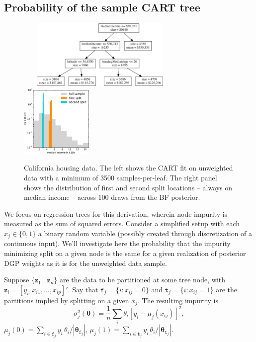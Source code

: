 \documentclass{article}
\begin{document}
\subsection{Probability of the sample CART
tree}\label{probability-of-the-sample-cart-tree}



\begin{figure}
~~~
\includegraphics[width=0.6\textwidth]{../graphs/ca_trunk}
~~~~~~
\includegraphics[width=0.31\textwidth]{../graphs/ca_splits}
\caption{\label{calistable} California housing data.  The left shows the CART fit  on unweighted data with a minimum of 3500 samples-per-leaf. The right panel shows the distribution of first and second split locations -- always on median income  -- across 100 draws from the BF posterior. }
\end{figure}

We focus on regression trees for this derivation, wherein node impurity is
measured as the sum of squared errors. Consider a simplified setup
with each $x_j \in \{0,1\}$  a binary random variable (possibly
created through discretization of a continuous input).  We'll investigate here the probability that the impurity minimizing split on a given node is the same for a given realization of posterior DGP weights as it is for the unweighted data sample.   

Suppose  $\{\mathbf{z}_1 \ldots \mathbf{z}_n\}$ are the data to be partitioned at some tree node, with $\mathbf{z}_i = [y_i, x_{i1}, \dots, x_{ip}]'$.  Say that
$\texttt{f}_j=\{i:x_{ij}=0\}$ and $\texttt{t}_j=\{i:x_{ij}=1\}$ are the
partitions implied by splitting on a given $x_j$. The resulting impurity is
\begin{equation}
\sigma^2_j(\boldsymbol{\theta}) = \frac{1}{n}\sum_i \theta_i \left[y_i - \mu_j(x_{ij})\right]^2,
\end{equation}
$\mu_j(0) = \sum_{i \in \texttt{f}_j}y_i \,\theta_i/\left|\boldsymbol{\theta}_{\texttt{f}_j}\right|$,
$\mu_j(1) = \sum_{i \in \texttt{t}_j}y_i \,\theta_i/\left|\boldsymbol{\theta}_{\texttt{t}_j}\right|$.
\end{document}
